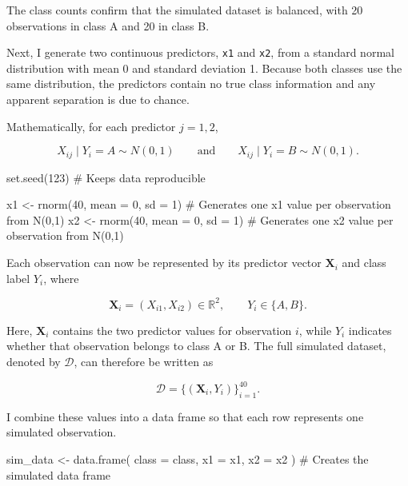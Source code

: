 \documentclass[
  letterpaper,
  DIV=11,
  numbers=noendperiod]{scrreprt}
\newenvironment{Shaded}{\begin{snugshade}}{\end{snugshade}}
\newcommand{\AttributeTok}[1]{\textcolor[rgb]{0.40,0.45,0.13}{#1}}
\newcommand{\CommentTok}[1]{\textcolor[rgb]{0.37,0.37,0.37}{#1}}
\newcommand{\DecValTok}[1]{\textcolor[rgb]{0.68,0.00,0.00}{#1}}
\newcommand{\FunctionTok}[1]{\textcolor[rgb]{0.28,0.35,0.67}{#1}}
\newcommand{\NormalTok}[1]{\textcolor[rgb]{0.00,0.23,0.31}{#1}}
\newcommand{\OtherTok}[1]{\textcolor[rgb]{0.00,0.23,0.31}{#1}}
\begin{document}
The class counts confirm that the simulated dataset is balanced, with 20
observations in class A and 20 in class B.

Next, I generate two continuous predictors, \texttt{x1} and \texttt{x2},
from a standard normal distribution with mean 0 and standard deviation
1. Because both classes use the same distribution, the predictors
contain no true class information and any apparent separation is due to
chance.

Mathematically, for each predictor \(j=1,2\),

\[
X_{ij} \mid Y_i=A \sim N(0,1)
\qquad \text{and} \qquad
X_{ij} \mid Y_i=B \sim N(0,1).
\]

\begin{Shaded}
\begin{Highlighting}[]
\FunctionTok{set.seed}\NormalTok{(}\DecValTok{123}\NormalTok{) }\CommentTok{\# Keeps data reproducible}

\NormalTok{x1 }\OtherTok{\textless{}{-}} \FunctionTok{rnorm}\NormalTok{(}\DecValTok{40}\NormalTok{, }\AttributeTok{mean =} \DecValTok{0}\NormalTok{, }\AttributeTok{sd =} \DecValTok{1}\NormalTok{) }\CommentTok{\# Generates one x1 value per observation from N(0,1)}
\NormalTok{x2 }\OtherTok{\textless{}{-}} \FunctionTok{rnorm}\NormalTok{(}\DecValTok{40}\NormalTok{, }\AttributeTok{mean =} \DecValTok{0}\NormalTok{, }\AttributeTok{sd =} \DecValTok{1}\NormalTok{) }\CommentTok{\# Generates one x2 value per observation from N(0,1)}
\end{Highlighting}
\end{Shaded}

Each observation can now be represented by its predictor vector
\(\mathbf{X}_i\) and class label \(Y_i\), where

\[
\mathbf{X}_i = (X_{i1}, X_{i2}) \in \mathbb{R}^2,
\qquad
Y_i \in \{A,B\}.
\]

Here, \(\mathbf{X}_i\) contains the two predictor values for observation
\(i\), while \(Y_i\) indicates whether that observation belongs to class
A or B. The full simulated dataset, denoted by \(\mathcal{D}\), can
therefore be written as

\[
\mathcal{D} = \{(\mathbf{X}_i, Y_i)\}_{i=1}^{40}.
\]

I combine these values into a data frame so that each row represents one
simulated observation.

\begin{Shaded}
\begin{Highlighting}[]
\NormalTok{sim\_data }\OtherTok{\textless{}{-}} \FunctionTok{data.frame}\NormalTok{(}
  \AttributeTok{class =}\NormalTok{ class,}
  \AttributeTok{x1 =}\NormalTok{ x1,}
  \AttributeTok{x2 =}\NormalTok{ x2}
\NormalTok{) }\CommentTok{\# Creates the simulated data frame}
\end{Highlighting}
\end{Shaded}
\end{document}
